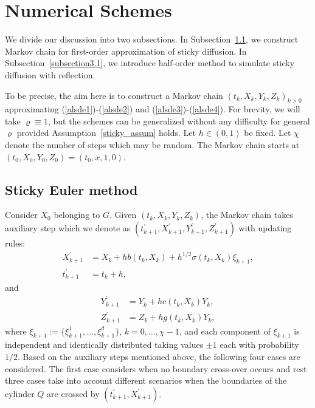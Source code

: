 \documentclass{article}
\theoremstyle{definition}
\numberwithin{equation}{section}
\begin{document}

\section{Numerical Schemes}\label{sticky_num_method_section}
 We divide our discussion into two subsections. 
 In Subsection~\ref{subsection3.2}, we construct Markov chain for first-order approximation of sticky diffusion.  In Subsection~\ref{subsection3.1}, we introduce half-order method to simulate sticky diffusion with reflection. 
 
To be precise, the aim here is to construct a Markov chain $(t_{k}, X_{k}, Y_{k}, Z_{k})_{k > 0}$ approximating (\ref{alsde1})-(\ref{alsde2}) and (\ref{alsde3})-(\ref{alsde4}). For brevity, we will take $\varrho \equiv 1$, but the schemes can be generalized without any difficulty for general $\varrho$ provided Assumption~\ref{sticky_assum} holds.  Let $h \in (0, 1)$ be fixed. Let $\chi$ denote the number of steps which may be random. The Markov chain starts at $(t_{0}, X_{0}, Y_{0}, Z_{0})= (t_{0}, x, 1, 0)$.




\subsection{Sticky Euler method} \label{subsection3.2}

 Consider $X_0 $ belonging to $G$. Given $(t_k, X_k, Y_k, Z_k)$, the Markov chain takes auxiliary step which we denote as $(t_{k+1}^{'}, X_{k+1}^{'}, Y_{k+1}^{'}, Z_{k+1}^{'})$ with updating rules: 
\begin{align}
X_{k+1}^{'} &= X_{k } + hb(t_k, X_{k}) + h^{1/2}\sigma(t_k, X_k)\xi_{k+1},\label{sticky_eulerscheme_x}\\ 
t_{k+1}^{'} &= t_{k} + h, \label{sticky_eulerscheme_t}
\end{align}
and
\begin{align}
Y_{k+1}^{'} &= Y_{k} + hc(t_{k},X_{k})Y_{k},\label{sticky_eulerscheme_y} \\
Z_{k+1}^{'} &= Z_{k} + hg(t_{k},X_{k})Y_{k},\label{sticky_eulerscheme_z} 
\end{align}
where $\xi_{k+1} := \{ \xi_{k+1}^{1}, \dots, \xi_{k+1}^{d} \}$, $k = 0,\dots, \chi-1$, and each component of $\xi_{k+1}$ is independent and identically distributed taking values $\pm 1$ each with probability $1/2$. 
Based on the auxiliary steps mentioned above, the following four cases are considered. The first case considers when no boundary cross-over occurs and rest three cases take into account different scenarios when the boundaries of the cylinder $Q$ are crossed by  $(t_{k+1}^{'}, X_{k+1}^{'})$.
\end{document}
